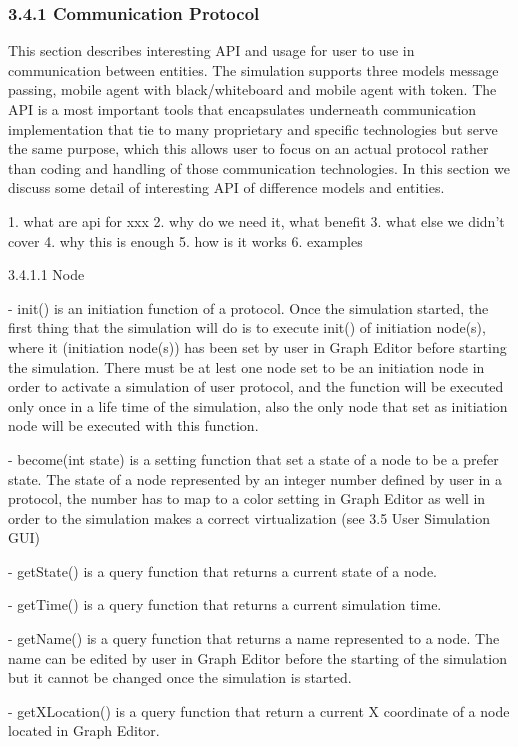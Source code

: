 \begin{description}
\begin{description}
\begin{description}
\begin{description}
\subsubsection{3.4.1 Communication Protocol}
This section describes interesting API and usage for user to use in communication between entities. The simulation supports three models message passing, mobile agent with black/whiteboard and mobile agent with token. The API is a most important tools that encapsulates underneath communication implementation that tie to many proprietary and specific technologies but serve the same purpose, which this allows user to focus on an actual protocol rather than coding and handling of those communication technologies. In this section we discuss some detail of interesting API of difference models and entities.


1. what are api for xxx
2. why do we need it, what benefit
3. what else we didn't cover
4. why this is enough
5. how is it works
6. examples

3.4.1.1 Node

- init() is an initiation function of a protocol. Once the simulation started, the first thing that the simulation will do is to execute init() of initiation node(s), where it (initiation node(s)) has been set by user in Graph Editor before starting the simulation. There must be at lest one node set to be an initiation node in order to activate a simulation of user protocol, and the function will be executed only once in a life time of the simulation, also the only node that set as initiation node will be executed with this function.

- become(int state) is a setting function that set a state of a node to be a prefer state. The state of a node represented by an integer number defined by user in a protocol, the number has to map to a color setting in Graph Editor as well in order to the simulation makes a correct virtualization (see 3.5 User Simulation GUI)

- getState() is a query function that returns a current state of a node.

- getTime() is a query function that returns a current simulation time.

- getName() is a query function that returns a name represented to a node. The name can be edited by user in Graph Editor before the starting of the simulation but it cannot be changed once the simulation is started.

- getXLocation() is a query function that return a current X coordinate of a node located in Graph Editor.


\end{description}
\end{description}
\end{description}
\end{description}

